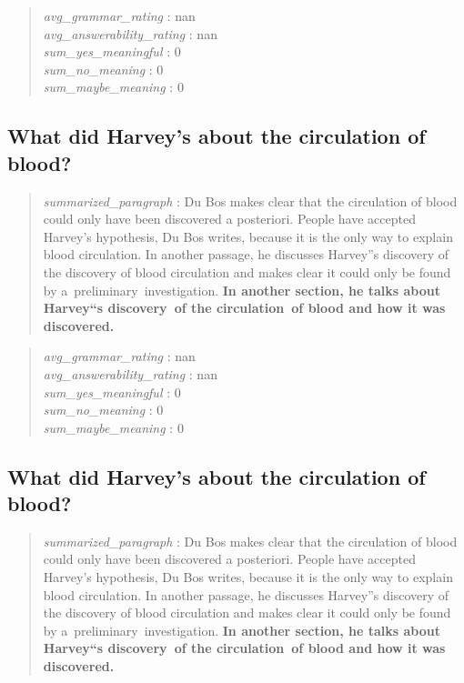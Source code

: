 \begin{quote}
\emph{avg\_grammar\_rating} : nan\\
\emph{avg\_answerability\_rating} : nan\\
\emph{sum\_yes\_meaningful} : 0\\
\emph{sum\_no\_meaning} : 0\\
\emph{sum\_maybe\_meaning} : 0
\end{quote}

\hypertarget{what-did-harveys-about-the-circulation-of-blood}{%
\subsection{What did Harvey's about the circulation of
blood?}\label{what-did-harveys-about-the-circulation-of-blood}}

\begin{quote}
\emph{summarized\_paragraph} : Du Bos makes clear that the circulation
of blood could only have been discovered a posteriori. People have
accepted Harvey's hypothesis, Du Bos writes, because it is the only way
to explain blood circulation. In another passage, he discusses Harvey''s
discovery of the discovery of blood circulation and makes clear it could
only be found by a~preliminary~investigation. \textbf{In another
section, he talks about Harvey``s discovery~of the circulation~of blood
and how it was discovered.}
\end{quote}

\begin{quote}
\emph{avg\_grammar\_rating} : nan\\
\emph{avg\_answerability\_rating} : nan\\
\emph{sum\_yes\_meaningful} : 0\\
\emph{sum\_no\_meaning} : 0\\
\emph{sum\_maybe\_meaning} : 0
\end{quote}

\hypertarget{what-did-harveys-about-the-circulation-of-blood-1}{%
\subsection{What did Harvey's about the circulation of
blood?}\label{what-did-harveys-about-the-circulation-of-blood-1}}

\begin{quote}
\emph{summarized\_paragraph} : Du Bos makes clear that the circulation
of blood could only have been discovered a posteriori. People have
accepted Harvey's hypothesis, Du Bos writes, because it is the only way
to explain blood circulation. In another passage, he discusses Harvey''s
discovery of the discovery of blood circulation and makes clear it could
only be found by a~preliminary~investigation. \textbf{In another
section, he talks about Harvey``s discovery~of the circulation~of blood
and how it was discovered.}
\end{quote}

